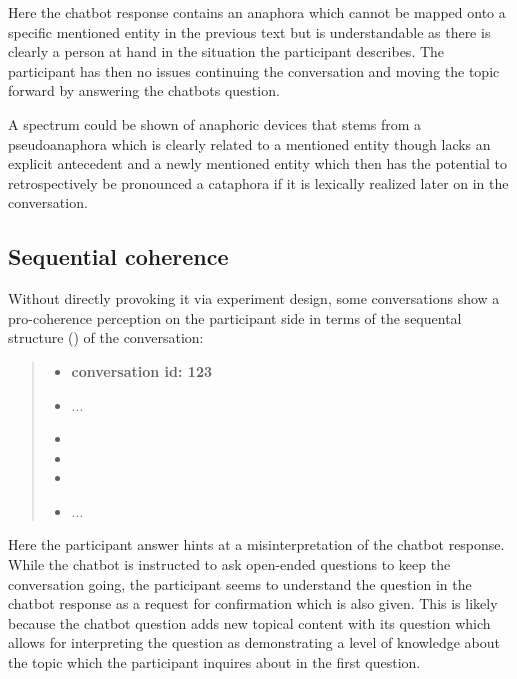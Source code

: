     Here the chatbot response contains an anaphora which
    cannot be mapped onto a specific mentioned entity in the previous text
    but is understandable as there is clearly a person at hand in the situation the participant describes.
    The participant has then no issues continuing the conversation and
    moving the topic forward by answering the chatbots question.

    A spectrum could be shown of anaphoric devices
    that stems from a pseudoanaphora which is clearly related to a mentioned entity
    though lacks an explicit antecedent and
    a newly mentioned entity which then has the potential to retrospectively be pronounced a cataphora
    if it is lexically realized later on in the conversation.

\subsection{Sequential coherence}

Without directly provoking it via experiment design,
some conversations show a pro-coherence perception on the participant side
in terms of the sequental structure () of the conversation:

    \begin{quote}
    \begin{itemize}[label={}, leftmargin=0pt, itemsep=0.5em]
    \item \textbf{conversation id: 123}
    \item ...
    \item {}
    \item {}
    \item {}
    \item ...
    \end{itemize}
    \end{quote}

Here the participant answer hints at a misinterpretation of the chatbot response.
While the chatbot is instructed to ask open-ended questions to keep the conversation going,
the participant seems to understand the question in the chatbot response
as a request for confirmation which is also given.
This is likely because the chatbot question adds new topical content with its question
which allows for interpreting the question as demonstrating a level of knowledge about the topic
which the participant inquires about in the first question.

